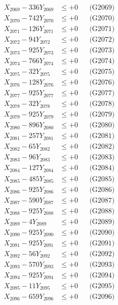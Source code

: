 \documentclass[a4paper,10pt]{article}
\begin{document}
{\begin{align}
X_{2069} - 336Y_{2069} &\leq +0 && \text{(G2069)} \\
X_{2070} - 742Y_{2070} &\leq +0 && \text{(G2070)} \\
\allowbreak
X_{2071} - 126Y_{2071} &\leq +0 && \text{(G2071)} \\
X_{2072} - 94Y_{2072} &\leq +0 && \text{(G2072)} \\
X_{2073} - 925Y_{2073} &\leq +0 && \text{(G2073)} \\
X_{2074} - 766Y_{2074} &\leq +0 && \text{(G2074)} \\
X_{2075} - 32Y_{2075} &\leq +0 && \text{(G2075)} \\
X_{2076} - 128Y_{2076} &\leq +0 && \text{(G2076)} \\
X_{2077} - 925Y_{2077} &\leq +0 && \text{(G2077)} \\
X_{2078} - 32Y_{2078} &\leq +0 && \text{(G2078)} \\
X_{2079} - 925Y_{2079} &\leq +0 && \text{(G2079)} \\
X_{2080} - 896Y_{2080} &\leq +0 && \text{(G2080)} \\
\allowbreak
X_{2081} - 257Y_{2081} &\leq +0 && \text{(G2081)} \\
X_{2082} - 65Y_{2082} &\leq +0 && \text{(G2082)} \\
X_{2083} - 96Y_{2083} &\leq +0 && \text{(G2083)} \\
X_{2084} - 127Y_{2084} &\leq +0 && \text{(G2084)} \\
X_{2085} - 485Y_{2085} &\leq +0 && \text{(G2085)} \\
X_{2086} - 925Y_{2086} &\leq +0 && \text{(G2086)} \\
X_{2087} - 590Y_{2087} &\leq +0 && \text{(G2087)} \\
X_{2088} - 925Y_{2088} &\leq +0 && \text{(G2088)} \\
X_{2089} - 4Y_{2089} &\leq +0 && \text{(G2089)} \\
X_{2090} - 925Y_{2090} &\leq +0 && \text{(G2090)} \\
\allowbreak
X_{2091} - 925Y_{2091} &\leq +0 && \text{(G2091)} \\
X_{2092} - 56Y_{2092} &\leq +0 && \text{(G2092)} \\
X_{2093} - 570Y_{2093} &\leq +0 && \text{(G2093)} \\
X_{2094} - 925Y_{2094} &\leq +0 && \text{(G2094)} \\
X_{2095} - 11Y_{2095} &\leq +0 && \text{(G2095)} \\
X_{2096} - 659Y_{2096} &\leq +0 && \text{(G2096)} \\

\end{align}}
\end{document}

